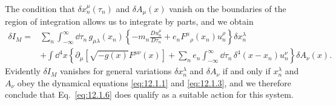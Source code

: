 The condition that \(\delta x_n^\mu(\tau_n)\) and \(\delta A_\mu(x)\)
vanish on the boundaries of the region of integration allows us to integrate
by parts, and we obtain
\[
\begin{aligned}
\delta I_M={}&
\sum_n\int_{-\infty}^{\infty}\dd\tau_n\,
g_{\mu\lambda}(x_n)
\left\{
  -m_n\frac{D u_n^\mu}{D\tau_n}
  +e_n F^\mu{}_\rho(x_n)u_n^\rho
\right\}\delta x_n^\lambda
\\
&+\int\dd^4x
\left\{
  \partial_\mu\!\left[\sqrt{-g(x)}F^{\mu\nu}(x)\right]
  +\sum_n e_n\int_{-\infty}^{\infty}\dd\tau_n\,
    \delta^4(x-x_n)u_n^\nu
\right\}\delta A_\nu(x).
\end{aligned}
\]
Evidently \(\delta I_M\) vanishes for general variations
\(\delta x_n^\lambda\) and \(\delta A_\nu\) if and only if
\(x_n^\lambda\) and \(A_\nu\) obey the dynamical equations
\eqref{eq:12.1.1} and \eqref{eq:12.1.3}, and we therefore conclude that
Eq.~\eqref{eq:12.1.6} does qualify as a suitable action for this system.
